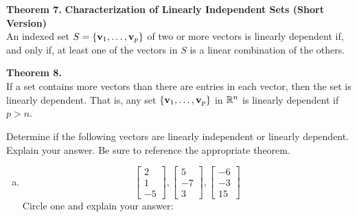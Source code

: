 \begin{boxthm}
	\textbf{Theorem 7.}
	\textbf{Characterization of Linearly Independent Sets (Short Version)} \\
	An indexed set $S=\{\boldsymbol{\mathbf{v}}_1,\ldots,\boldsymbol{\mathbf{v}}_p\}$ of two or more vectors is linearly dependent if, and only if, at least one of the vectors in $S$ is a linear combination of the others.
\end{boxthm}
\begin{boxthm}
	\textbf{Theorem 8.} \\
	If a set contains more vectors than there are entries in each vector, then the set is linearly dependent. That is, any set $\{\boldsymbol{\mathbf{v}}_1,\ldots,\boldsymbol{\mathbf{v}}_p\}$ in $\mathbb{R}^n$ is linearly dependent if $p>n$.
\end{boxthm}
\begin{exercise} %
	Determine if the following vectors are linearly independent or linearly dependent. Explain your answer. Be sure to reference the appropriate theorem.
		\begin{multicols}{2}
			\begin{enumerate}[(a)]
				\item
					$$
					\begin{bmatrix} 2\\1\\-5 \end{bmatrix},
					\begin{bmatrix} 5\\-7\\3 \end{bmatrix},
					\begin{bmatrix} -6\\-3\\15 \end{bmatrix}
					$$
					Circle one and explain your answer:
					\begin{center}
						 \qquad
					\end{center}
				
				\columnbreak
				

\end{enumerate}
\end{multicols}
\end{exercise}
